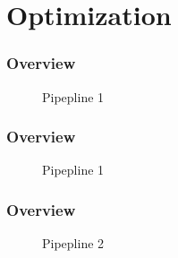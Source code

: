 \documentclass{beamer}
\begin{document}
\section{Optimization}
\begin{frame} %
	\frametitle{Overview} %
		\begin{figure}[h]
		\centering
		\caption{Pipepline 1}
	\end{figure}
\end{frame}
\begin{frame} %
	\frametitle{Overview} %
	\begin{figure}[h]
		\centering
		\caption{Pipepline 1}
	\end{figure}
\end{frame}
\begin{frame} %
	\frametitle{Overview} %
	\begin{figure}[h]
		\centering
		\caption{Pipepline 2}
	\end{figure}
\end{frame}
\end{document}
